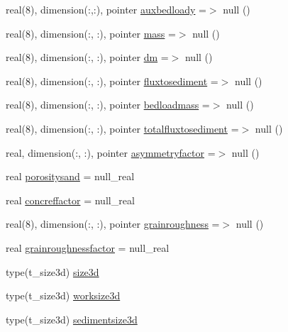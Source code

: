 \begin{DoxyCompactItemize}
\item 
real(8), dimension(\+:,\+:), pointer \mbox{\hyperlink{structmodulesediment_1_1t__sediment_a76c4e43db794cb11a2dc6e3825d5e2c6}{auxbedloady}} =$>$ null ()
\item 
real(8), dimension(\+:, \+:), pointer \mbox{\hyperlink{structmodulesediment_1_1t__sediment_a3e2b0dfb7e3a3e93f25b6adbacc346d6}{mass}} =$>$ null ()
\item 
real(8), dimension(\+:, \+:), pointer \mbox{\hyperlink{structmodulesediment_1_1t__sediment_aab0da1026fe7594593338fa10ef0e7cd}{dm}} =$>$ null ()
\item 
real(8), dimension(\+:, \+:), pointer \mbox{\hyperlink{structmodulesediment_1_1t__sediment_ab9d175dd780f8a24be1337d181376941}{fluxtosediment}} =$>$ null ()
\item 
real(8), dimension(\+:, \+:), pointer \mbox{\hyperlink{structmodulesediment_1_1t__sediment_a832f3e9f6c89221ec6aace3cb9d1ea28}{bedloadmass}} =$>$ null ()
\item 
real(8), dimension(\+:, \+:), pointer \mbox{\hyperlink{structmodulesediment_1_1t__sediment_a02a25b59615a16e74b61b98cef573069}{totalfluxtosediment}} =$>$ null ()
\item 
real, dimension(\+:, \+:), pointer \mbox{\hyperlink{structmodulesediment_1_1t__sediment_a6303a25558393db979c42113940fc732}{asymmetryfactor}} =$>$ null ()
\item 
real \mbox{\hyperlink{structmodulesediment_1_1t__sediment_a221e41e989eb1710e9512d3415ec3b67}{porositysand}} = null\+\_\+real
\item 
real \mbox{\hyperlink{structmodulesediment_1_1t__sediment_a645643fe5121da74bb9793f59da6a0ca}{concreffactor}} = null\+\_\+real
\item 
real(8), dimension(\+:, \+:), pointer \mbox{\hyperlink{structmodulesediment_1_1t__sediment_a2a43fa8fad6fb6fa9fc64b271f6e8ffc}{grainroughness}} =$>$ null ()
\item 
real \mbox{\hyperlink{structmodulesediment_1_1t__sediment_a20be1cf3633dc3a5a560567bbd2caf95}{grainroughnessfactor}} = null\+\_\+real
\item 
type(t\+\_\+size3d) \mbox{\hyperlink{structmodulesediment_1_1t__sediment_a6a74ee07fa7eee2ef9abf3a97b71261c}{size3d}}
\item 
type(t\+\_\+size3d) \mbox{\hyperlink{structmodulesediment_1_1t__sediment_a8091339194971a877eee2848dda8ddd0}{worksize3d}}
\item 
type(t\+\_\+size3d) \mbox{\hyperlink{structmodulesediment_1_1t__sediment_aa27e5571805a184bc6d6b0bed72106ac}{sedimentsize3d}}

\end{DoxyCompactItemize}

